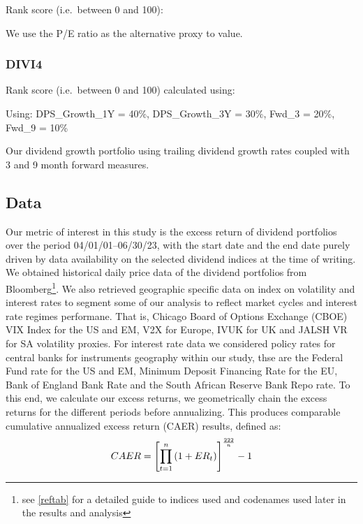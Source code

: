 \documentclass[12pt,preprint, authoryear]{elsarticle}
\numberwithin{equation}{section}
\numberwithin{figure}{section}
\numberwithin{table}{section}
\let\rmarkdownfootnote\footnote%
\def\footnote{\protect\rmarkdownfootnote}
\begin{document}
Rank score (i.e.~between 0 and 100):

We use the P/E ratio as the alternative proxy to value.

\hypertarget{divi4}{%
\subsubsection{DIVI4}\label{divi4}}

Rank score (i.e.~between 0 and 100) calculated using:

Using: DPS\_Growth\_1Y = 40\%, DPS\_Growth\_3Y = 30\%, Fwd\_3 = 20\%,
Fwd\_9 = 10\%

Our dividend growth portfolio using trailing dividend growth rates
coupled with 3 and 9 month forward measures.

\newpage

\hypertarget{data}{%
\subsection{Data}\label{data}}

Our metric of interest in this study is the excess return of dividend
portfolios over the period 04/01/01--06/30/23, with the start date and
the end date purely driven by data availability on the selected dividend
indices at the time of writing. We obtained historical daily price data
of the dividend portfolios from Bloomberg\footnote{see \ref{reftab} for
  a detailed guide to indices used and codenames used later in the
  results and analysis}. We also retrieved geographic specific data on
index on volatility and interest rates to segment some of our analysis
to reflect market cycles and interest rate regimes performane. That is,
Chicago Board of Options Exchange (CBOE) VIX Index for the US and EM,
V2X for Europe, IVUK for UK and JALSH VR for SA volatility proxies. For
interest rate data we considered policy rates for central banks for
instruments geography within our study, thse are the Federal Fund rate
for the US and EM, Minimum Deposit Financing Rate for the EU, Bank of
England Bank Rate and the South African Reserve Bank Repo rate. To this
end, we calculate our excess returns, we geometrically chain the excess
returns for the different periods before annualizing. This produces
comparable cumulative annualized excess return (CAER) results, defined
as: \begin{align}
C A E R=\left[\prod_{t=1}^n\left(1+E R_t\right)\right]^{\frac{222}{n}}-1 \notag
\end{align}
\end{document}
